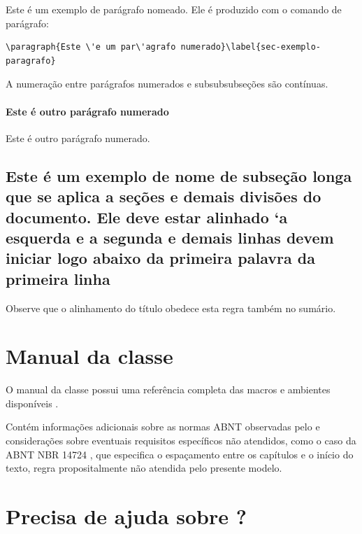 Este \'e um exemplo de par\'agrafo nomeado. Ele \'e produzido com o comando de
par\'agrafo:

\begin{verbatim}
\paragraph{Este \'e um par\'agrafo numerado}\label{sec-exemplo-paragrafo}
\end{verbatim}

A numeração entre par\'agrafos numerados e subsubsubseções são contínuas.

\paragraph{Este \'e outro par\'agrafo numerado}\label{sec-exemplo-paragrafo-outro}

Este \'e outro par\'agrafo numerado.

\subsection{Este \'e um exemplo de nome de subseção longa que se aplica a seções e demais divisões do documento. Ele deve estar alinhado `a esquerda e a segunda e demais linhas devem iniciar logo abaixo da primeira palavra da primeira linha} 

Observe que o alinhamento do título obedece esta regra tamb\'em no sum\'ario.
	

\section{Manual da classe \textsf{\abnTeX}}

O manual da classe \textsf{\abnTeX} possui uma refer\^encia completa das macros e ambientes disponíveis \cite{abnetxclasse}.

Cont\'em informações adicionais sobre as normas ABNT
observadas pelo \textsf{\abnTeX} e considerações sobre eventuais requisitos específicos
não atendidos, como o caso da ABNT NBR 14724 \cite{nbr14724}, que
especifica o espaçamento entre os capítulos e o início do texto, regra
propositalmente não atendida pelo presente modelo.

\section{Precisa de ajuda sobre \textsf{\abnTeX}?}

